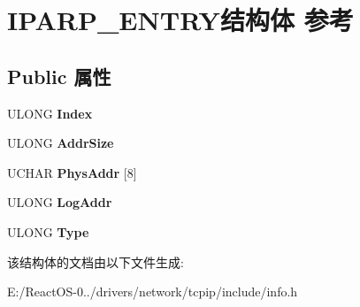 \hypertarget{struct_i_p_a_r_p___e_n_t_r_y}{}\section{I\+P\+A\+R\+P\+\_\+\+E\+N\+T\+R\+Y结构体 参考}
\label{struct_i_p_a_r_p___e_n_t_r_y}
\subsection*{Public 属性}
\begin{DoxyCompactItemize}
\item 
\mbox{\label{struct_i_p_a_r_p___e_n_t_r_y_a13fd47117418cbc4115803db1335579d}} 
U\+L\+O\+NG {\bfseries Index}
\item 
\mbox{\label{struct_i_p_a_r_p___e_n_t_r_y_ad55228e3dd228da97631dcfbf3f71ab5}} 
U\+L\+O\+NG {\bfseries Addr\+Size}
\item 
\mbox{\label{struct_i_p_a_r_p___e_n_t_r_y_abe1012985f4b303f9c59ec03ad243e9e}} 
U\+C\+H\+AR {\bfseries Phys\+Addr} \mbox{[}8\mbox{]}
\item 
\mbox{\label{struct_i_p_a_r_p___e_n_t_r_y_a5719235afc53405ab4b8c18c9de52cc8}} 
U\+L\+O\+NG {\bfseries Log\+Addr}
\item 
\mbox{\label{struct_i_p_a_r_p___e_n_t_r_y_a242461d6b511f34f761c17f2dbb68d92}} 
U\+L\+O\+NG {\bfseries Type}
\end{DoxyCompactItemize}


该结构体的文档由以下文件生成\+:\begin{DoxyCompactItemize}
\item 
E\+:/\+React\+O\+S-\/0../drivers/network/tcpip/include/info.\+h\end{DoxyCompactItemize}
